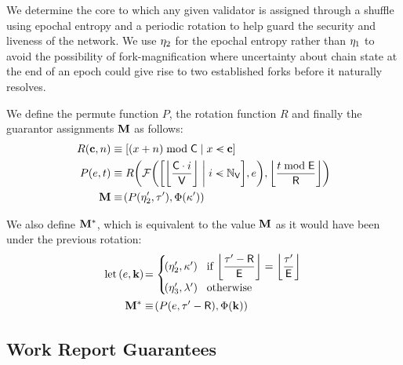 We determine the core to which any given validator is assigned through a shuffle using epochal entropy and a periodic rotation to help guard the security and liveness of the network. We use $\eta_2$ for the epochal entropy rather than $\eta_1$ to avoid the possibility of fork-magnification where uncertainty about chain state at the end of an epoch could give rise to two established forks before it naturally resolves.

We define the permute function $P$, the rotation function $R$ and finally the guarantor assignments  $\mathbf{M}$ as follows:
\begin{align}
  R(\mathbf{c}, n) &\equiv \sq{\build{(x + n) \bmod \corecount}{x \orderedin \mathbf{c}}}\\
  P(e, t) &\equiv R\left(
    \fyshuffle{\sq{\build{\ffrac{\corecount \cdot i}{\valcount}}{i \orderedin \valindex}}, e},
    \ffrac{t \bmod \epochlen}{\mathsf{R}}
  \right)\\
  \guarantorassignments &\equiv \tup{P(\entropy'_2, \thetime'), \Phi(\activeset')}
\end{align}

We also define $\mathbf{M}^*$, which is equivalent to the value $\mathbf{M}$ as it would have been under the previous rotation:
\begin{equation}
  \label{eq:priorassignments}
  \begin{aligned}
    \using \tup{e, \mathbf{k}} &= \begin{cases}
      \tup{\entropy'_2, \activeset'} &\when \displaystyle\ffrac{\thetime' - \mathsf{R}}{\epochlen} = \ffrac{\thetime'}{\epochlen}\\
      \tup{\entropy'_3, \previousset'} &\otherwise
    \end{cases} \\
    \guarantorassignmentsunderlastrotation &\equiv \tup{
      P(e, \thetime' - \mathsf{R}),
      \Phi(\mathbf{k})
    }
  \end{aligned}
\end{equation}














\subsection{Work Report Guarantees}\label{sec:workreportguarantees}

